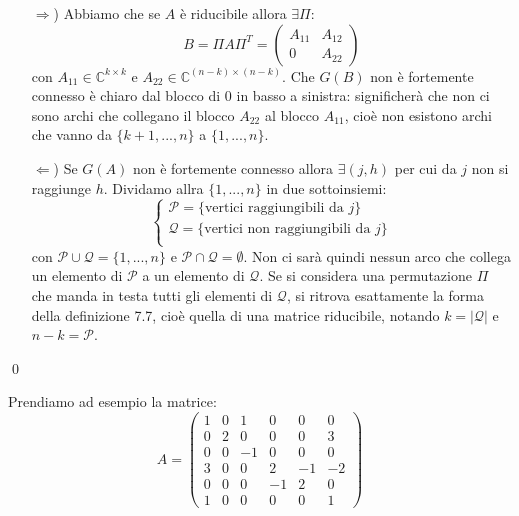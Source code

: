 \documentclass[a4paper,11pt]{article}
\begin{document}
\begin{itemize}
	\item[$\Rightarrow$)] 
Abbiamo che se $A$ è riducibile allora $\exists \Pi$:
$$
B = \Pi A \Pi^T = \begin{pmatrix}
	A_{11} & A_{12} \\
	0 & A_{22}
\end{pmatrix}
$$
con $A_{11} \in \mathbb{C}^{k\times k}$ e $A_{22} \in \mathbb{C}^{(n - k) \times (n - k)}$.
Che $G(B)$ non è fortemente connesso è chiaro dal blocco di 0 in basso a sinistra: significherà che non ci sono archi che collegano il blocco $A_{22}$ al blocco $A_{11}$, cioè non esistono archi che vanno da $\{k + 1, ..., n\}$ a $\{1, ..., n\}$.

\item[$\Leftarrow$)]
	Se $G(A)$ non è fortemente connesso allora $\exists (j, h)$ per cui da $j$ non si raggiunge $h$.
	Dividamo allra $\{1, ..., n\}$ in due sottoinsiemi:
	\[
		\begin{cases}
			\mathcal{P} = \{ \text{vertici raggiungibili da $j$} \}	\\
			\mathcal{Q} = \{ \text{vertici non raggiungibili da $j$} \}	\\
		\end{cases}
	\]
	con $\mathcal{P} \cup \mathcal{Q} = \{1, ..., n\}$ e $\mathcal{P} \cap \mathcal{Q} = \emptyset$.
	Non ci sarà quindi nessun arco che collega un elemento di $\mathcal{P}$ a un elemento di $\mathcal{Q}$.
	Se si considera una permutazione $\Pi$ che manda in testa tutti gli elementi di $\mathcal{Q}$, si ritrova esattamente la forma della definizione 7.7, cioè quella di una matrice riducibile, notando $k = |\mathcal{Q}|$ e $n - k = \mathcal{P}$.
\end{itemize} \qed

\par\smallskip

Prendiamo ad esempio la matrice:
$$
A = \begin{pmatrix}
	1 & 0 & 1 & 0 & 0 & 0 \\
	0 & 2 & 0 & 0 & 0 & 3 \\
	0 & 0 & -1 & 0 & 0 & 0 \\
	3 & 0 & 0 & 2 & -1 & -2 \\
	0 & 0 & 0 & -1 & 2 & 0 \\
	1 & 0 & 0 & 0 & 0 & 1
\end{pmatrix}
$$
\end{document}
